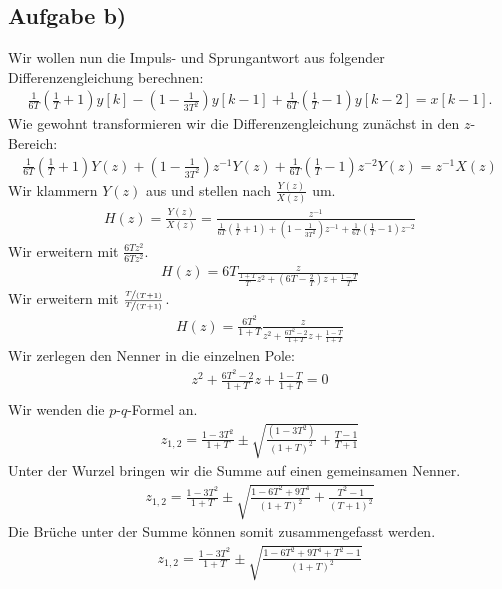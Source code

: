 \documentclass[11pt,a4paper,DIV=12]{scrartcl}
\begin{document}
\subsection{Aufgabe b)}
Wir wollen nun die Impuls- und Sprungantwort aus folgender Differenzengleichung berechnen:
\begin{gather}
	\frac{1}{6T}\left(\frac{1}{T}+1\right)y[k]-\left(1-\frac{1}{3T^2}\right)y[k-1]+\frac{1}{6T}\left(\frac{1}{T}-1\right)y[k-2]=x[k-1].
\end{gather}
Wie gewohnt transformieren wir die Differenzengleichung zunächst in den $z$-Bereich:
\begin{gather}
	\frac{1}{6T}\left(\frac{1}{T}+1\right)Y(z)+\left(1-\frac{1}{3T^2}\right)z^{-1}Y(z)+\frac{1}{6T}\left(\frac{1}{T}-1\right)z^{-2}Y(z)=z^{-1}X(z)
\end{gather}
Wir klammern $Y(z)$ aus und stellen nach $\frac{Y(z)}{X(z)}$ um.
\begin{gather}
	H(z)=\frac{Y(z)}{X(z)}=\frac{z^{-1}}{\frac{1}{6T}\left(\frac{1}{T}+1\right)+\left(1-\frac{1}{3T^2}\right)z^{-1}+\frac{1}{6T}\left(\frac{1}{T}-1\right)z^{-2}}
\end{gather}
Wir erweitern mit $\frac{6Tz^2}{6Tz^2}$.
\begin{gather}
	H(z)=6T\frac{z}{\frac{1+T}{T}z^2+\left(6T-\frac{2}{T}\right)z+\frac{1-T}{T}}
\end{gather}
Wir erweitern mit $\frac{\nicefrac{T}{(T+1)}}{\nicefrac{T}{(T+1)}}$.
\begin{gather}
	H(z)=\frac{6T^2}{1+T}\frac{z}{z^2+\frac{6T^2-2}{1+T}z+\frac{1-T}{1+T}}
\end{gather}
Wir zerlegen den Nenner in die einzelnen Pole:
\begin{gather}
	z^2+\frac{6T^2-2}{1+T}z+\frac{1-T}{1+T}=0\\
\end{gather}
Wir wenden die $p$-$q$-Formel an.
\begin{gather}
	z_{1,2}=\frac{1-3T^2}{1+T}\pm\sqrt{\frac{(1-3T^2)}{(1+T)^2}+\frac{T-1}{T+1}}
\end{gather}
Unter der Wurzel bringen wir die Summe auf einen gemeinsamen Nenner.
\begin{gather}
	z_{1,2}=\frac{1-3T^2}{1+T}\pm\sqrt{\frac{1-6T^2+9T^4}{(1+T)^2}+\frac{T^2-1}{(T+1)^2}}
\end{gather}
Die Brüche unter der Summe können somit zusammengefasst werden.
\begin{gather}
	z_{1,2}=\frac{1-3T^2}{1+T}\pm\sqrt{\frac{1-6T^2+9T^4+T^2-1}{(1+T)^2}}
\end{gather}
\end{document}
